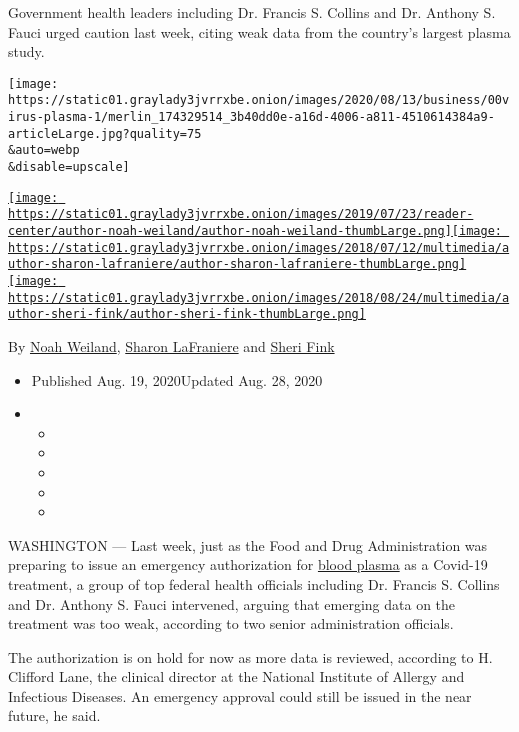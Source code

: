 Government health leaders including Dr. Francis S. Collins and Dr.
Anthony S. Fauci urged caution last week, citing weak data from the
country's largest plasma study.

\texttt{[image: https://static01.graylady3jvrrxbe.onion/images/2020/08/13/business/00virus-plasma-1/merlin\_174329514\_3b40dd0e-a16d-4006-a811-4510614384a9-articleLarge.jpg?quality=75\\\&auto=webp\\\&disable=upscale]}

\href{https://www.nytimes3xbfgragh.onion/by/noah-weiland}{\texttt{[image: https://static01.graylady3jvrrxbe.onion/images/2019/07/23/reader-center/author-noah-weiland/author-noah-weiland-thumbLarge.png]}}\href{https://www.nytimes3xbfgragh.onion/by/sharon-lafraniere}{\texttt{[image: https://static01.graylady3jvrrxbe.onion/images/2018/07/12/multimedia/author-sharon-lafraniere/author-sharon-lafraniere-thumbLarge.png]}}\href{https://www.nytimes3xbfgragh.onion/by/sheri-fink}{\texttt{[image: https://static01.graylady3jvrrxbe.onion/images/2018/08/24/multimedia/author-sheri-fink/author-sheri-fink-thumbLarge.png]}}

By \href{https://www.nytimes3xbfgragh.onion/by/noah-weiland}{Noah
Weiland},
\href{https://www.nytimes3xbfgragh.onion/by/sharon-lafraniere}{Sharon
LaFraniere} and
\href{https://www.nytimes3xbfgragh.onion/by/sheri-fink}{Sheri Fink}

\begin{itemize}
\item
  Published Aug. 19, 2020Updated Aug. 28, 2020
\item
  \begin{itemize}
  \item
  \item
  \item
  \item
  \item
  \end{itemize}
\end{itemize}

WASHINGTON --- Last week, just as the Food and Drug Administration was
preparing to issue an emergency authorization for
\href{https://www.nytimes3xbfgragh.onion/2020/08/28/health/blood-plasma-fda.html}{blood
plasma} as a Covid-19 treatment, a group of top federal health officials
including Dr. Francis S. Collins and Dr. Anthony S. Fauci intervened,
arguing that emerging data on the treatment was too weak, according to
two senior administration officials.

The authorization is on hold for now as more data is reviewed, according
to H. Clifford Lane, the clinical director at the National Institute of
Allergy and Infectious Diseases. An emergency approval could still be
issued in the near future, he said.

